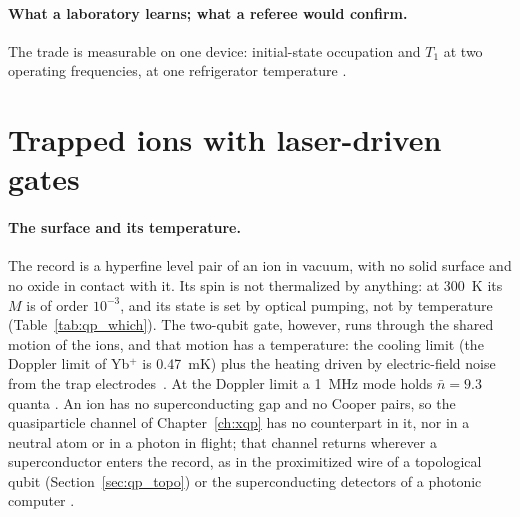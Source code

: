 \paragraph{What a laboratory learns; what a referee would confirm.} The trade is measurable on one device: initial-state occupation and
$T_1$ at two operating frequencies, at one refrigerator temperature \interp.

\section{Trapped ions with laser-driven gates}\label{sec:qp_ionlaser}
\paragraph{The surface and its temperature.} The record is a hyperfine level pair of an ion in vacuum, with no solid surface and no oxide
in contact with it. Its spin is not thermalized by anything: at 300~K its $M$ is of order $10^{-3}$, and its state is set by optical pumping, not by
temperature (Table~\ref{tab:qp_which}). The two-qubit gate, however, runs through the shared motion of the ions, and that motion has a
temperature: the cooling limit (the Doppler limit of Yb$^+$ is 0.47~mK) plus the heating driven by electric-field noise from the trap
electrodes~\cite{Brownnutt2015}. At the Doppler limit a 1~MHz mode holds $\bar n=9.3$ quanta \calc. An ion has no superconducting gap and no Cooper pairs, so the quasiparticle channel of Chapter~\ref{ch:xqp} has no counterpart in it,
nor in a neutral atom or in a photon in flight; that channel returns wherever a superconductor enters the record, as in the proximitized
wire of a topological qubit (Section~\ref{sec:qp_topo}) or the superconducting detectors of a photonic computer \interp.

